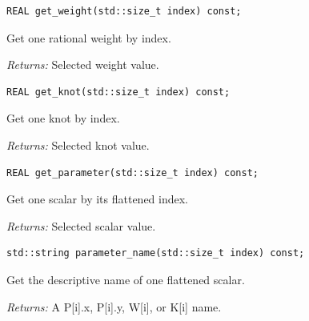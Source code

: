 \par\noindent\begin{minipage}{\linewidth}
\begin{lstlisting}[style=apireference]
REAL get_weight(std::size_t index) const;
\end{lstlisting}
{\footnotesize Get one rational weight by index.\par}
{\footnotesize\textit{Returns:} Selected weight value.\par}
\end{minipage}\par\vspace{1pt}
\par\noindent\begin{minipage}{\linewidth}
\begin{lstlisting}[style=apireference]
REAL get_knot(std::size_t index) const;
\end{lstlisting}
{\footnotesize Get one knot by index.\par}
{\footnotesize\textit{Returns:} Selected knot value.\par}
\end{minipage}\par\vspace{1pt}
\par\noindent\begin{minipage}{\linewidth}
\begin{lstlisting}[style=apireference]
REAL get_parameter(std::size_t index) const;
\end{lstlisting}
{\footnotesize Get one scalar by its flattened index.\par}
{\footnotesize\textit{Returns:} Selected scalar value.\par}
\end{minipage}\par\vspace{1pt}
\par\noindent\begin{minipage}{\linewidth}
\begin{lstlisting}[style=apireference]
std::string parameter_name(std::size_t index) const;
\end{lstlisting}
{\footnotesize Get the descriptive name of one flattened scalar.\par}
{\footnotesize\textit{Returns:} A P[i].x, P[i].y, W[i], or K[i] name.\par}
\end{minipage}\par\vspace{1pt}

